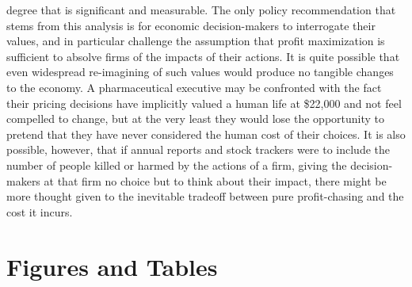 \documentclass[12pt,english]{article} \usepackage{mathptmx}
\begin{document}
degree that is significant and measurable. The only policy 
recommendation that stems from this analysis is for economic 
decision-makers to interrogate their values, and in particular challenge 
the assumption that profit maximization is sufficient to absolve firms 
of the impacts of their actions. It is quite possible that even 
widespread re-imagining of such values would produce no tangible changes 
to the economy. A pharmaceutical executive may be confronted with the 
fact their pricing decisions have implicitly valued a human life at 
\$22,000 and not feel compelled to change, but at the very least they 
would lose the opportunity to pretend that they have never considered 
the human cost of their choices. It is also possible, however, that if 
annual reports and stock trackers were to include the number of people 
killed or harmed by the actions of a firm, giving the decision-makers at 
that firm no choice but to think about their impact, there might be more 
thought given to the inevitable tradeoff between pure profit-chasing and 
the cost it incurs. 
\vfill 
\pagebreak{} 
 
\vfill 
\pagebreak{} 
\clearpage \section*{Figures and Tables} \begin{table}[htp] 
\caption{Drug and Disease Info} \label{Table 1 } \end{table} 
\end{document}

